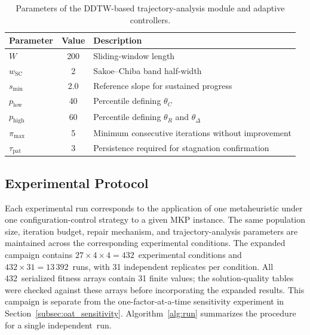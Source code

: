 \documentclass[mathematics,article,accept,moreauthors]{Definitions/mdpi}
\begin{document}
\begin{table}[H]
\caption{Parameters of the DDTW-based trajectory-analysis module and adaptive
controllers.}
\label{tab:dtw_params}
\begin{tabularx}{\textwidth}{@{}l c l@{}}
\toprule
\textbf{Parameter} & \textbf{Value} & \textbf{Description} \\
\midrule
$W$                  & 200 & Sliding-window length \\
$w_{\mathrm{SC}}$    & 2   & Sakoe--Chiba band half-width \\
$s_{\min}$           & 2.0 & Reference slope for sustained progress \\
$p_{\mathrm{low}}$   & 40  & Percentile defining $\theta_C$ \\
$p_{\mathrm{high}}$  & 60  & Percentile defining $\theta_R$ and $\theta_\Delta$ \\
$\pi_{\max}$         & 5   & Minimum consecutive iterations without improvement \\
$\tau_{\mathrm{pat}}$ & 3  & Persistence required for stagnation confirmation \\
\bottomrule
\end{tabularx}
\end{table}


\subsection{Experimental Protocol}
\label{sec:protocol}

Each experimental run corresponds to the application of one metaheuristic under one configuration-control strategy to a given MKP instance. The same
population size, iteration budget, repair mechanism, and trajectory-analysis
parameters are maintained across the corresponding experimental conditions.
The expanded campaign contains \mbox{$27\times4\times4=432$ experimental}
conditions and \mbox{$432\times31=13\,392$ runs,} with 31 independent replicates
per condition. All \mbox{432 serialized}
fitness arrays contain 31 finite values; the solution-quality tables were
checked against these arrays before incorporating the expanded results.
This campaign is separate from the one-factor-at-a-time sensitivity
experiment in Section~\ref{subsec:oat_sensitivity}.
Algorithm~\ref{alg:run} summarizes the procedure for a single \mbox{independent
run.}
\end{document}
